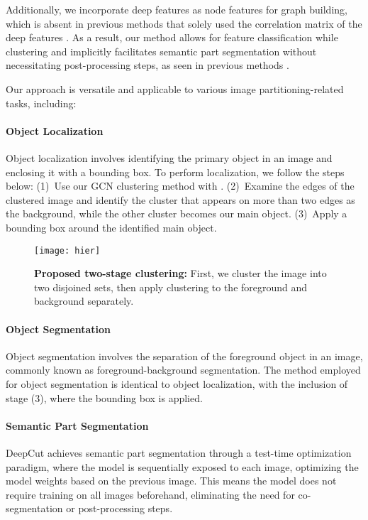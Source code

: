 \documentclass[10pt,twocolumn,letterpaper]{article}
\begin{document}
Additionally, we incorporate deep features as node features for graph building, which is absent in previous methods that solely used the correlation matrix of the deep features \cite{bianchi2020spectral, melas2022deep, wang2022self}. As a result, our method allows for feature classification while clustering and implicitly facilitates semantic part segmentation without necessitating post-processing steps, as seen in previous methods \cite{melas2022deep}.

Our approach is versatile and applicable to various image partitioning-related tasks, including:



\paragraph{Object Localization}
Object localization involves identifying the primary object in an image and enclosing it with a bounding box. To perform localization, we follow the steps below:
(1)~Use our GCN clustering method with . (2)~Examine the edges of the clustered image and identify the cluster that appears on more than two edges as the background, while the other cluster becomes our main object. (3)~Apply a bounding box around the identified main object.

\begin{figure}[t]
\texttt{[image: hier]}
\caption{
\textbf{Proposed two-stage clustering:} First, we cluster the image into two disjoined sets,  then apply clustering to the foreground and background separately.
}
\label{fig:hier}
 \end{figure}



\paragraph{Object Segmentation}
Object segmentation involves the separation of the foreground object in an image, commonly known as foreground-background segmentation. The method employed for object segmentation is identical to object localization, with the inclusion of stage (3), where the bounding box is applied.
 
\paragraph{Semantic Part Segmentation} 

DeepCut achieves semantic part segmentation through a test-time optimization paradigm, where the model is sequentially exposed to each image, optimizing the model weights based on the previous image. This means the model does not require training on all images beforehand, eliminating the need for co-segmentation or post-processing steps.
\end{document}
